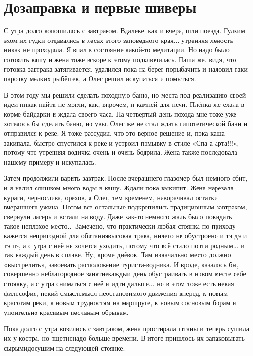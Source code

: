 \chapter{Дозаправка и первые шиверы} 

С утра долго копошились с завтраком. Вдалеке, как и вчера, шли поезда. Гулким эхом их гудки отдавались в лесах этого заповедного края$\ldots$ утренняя леность никак не проходила. Я впал в состояние какой-то медитации. Но надо было готовить кашу и жена тоже вскоре к этому подключилась. Паша же, видя, что готовка завтрака затягивается, удалился пока на берег порыбачить и наловил-таки парочку мелких рыбёшек, а Олег решил искупаться и помыться. 

В этом году мы решили сделать походную баню, но места под реализацию своей идеи никак найти не могли, как, впрочем, и камней для печи. Плёнка же ехала в корме байдарки и ждала своего часа. На четвертый день похода мне тоже уже хотелось бы сделать баню, но увы. Олег же не стал ждать гипотетической бани и отправился к реке. Я тоже рассудил, что это верное решение и, пока каша закипала, быстро спустился к реке и устроил помывку в стиле «Спа-а-арта!!!», потому что утренняя водичка очень и очень бодрила. Жена также последовала нашему примеру и искупалась. 

Затем продолжили варить завтрак. После вчерашнего глазомер был немного сбит, и я налил слишком много воды в кашу. Ждали пока выкипит. Жена нарезала кураги, чернослива, орехов, а Олег, тем временем, наворачивал остатки вчерашнего ужина. Потом все остальные подкрепились традиционным завтраком, свернули лагерь и встали на воду. Даже как-то немного жаль было покидать такое неплохое место$\ldots$ Замечено, что практически любая стоянка по приходу кажется непригодной для обитания\mdash высокая трава, ничего не обустроено и тэ дэ и тэ пэ, а с утра с неё не хочется уходить, потому что всё стало почти родным$\ldots$ и так каждый день в сплаве. Ну, кроме днёвок. Там изначально место должно «выстрелить», завоевать расположение туриста-водника. И вроде, казалось бы, совершенно неблагородное занятие\mdash каждый день обустраивать в новом месте себе стоянку, а с утра сниматься с неё и идти дальше$\ldots$ но в этом тоже есть некая философия, некий смысл\mdash смысл неостановимого движения вперед, к новым красотам реки, к новым трудностям на маршруте, к новым сосновым борам и упоительно красивым песчаным обрывам.

Пока долго с утра возились с завтраком, жена простирала штаны и теперь сушила их у костра, но тщетно\mdash надо больше времени. В итоге пришлось их запаковывать сырыми\mdash досушим на следующей стоянке. 

